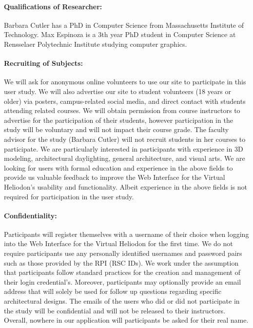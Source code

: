 \documentclass[12pt]{article}
\begin{document}
\paragraph{Qualifications of Researcher:}
Barbara Cutler has a PhD in Computer Science from Massachusetts
Institute of Technology.  Max Espinoza is a 3th year PhD student in
Computer Science at Rensselaer Polytechnic Institute studying computer
graphics.

\paragraph{Recruiting of Subjects:}
We will ask for anonymous online volunteers to use our site to participate in this user study. 
We will also advertise our site to student volunteers (18 years or older) via posters, campus-related social media, and direct contact with students attending related courses. 
We will obtain permission from course instructors to advertise for the participation of their students, however participation in the study will be voluntary and will not impact their course grade. 
The faculty advisor for the study (Barbara Cutler) will not recruit students in her courses to participate.  
We are particularly interested in participants with experience in 3D modeling, architectural daylighting, general architecture, and visual arts.
We are looking for users with formal education and experience in the above fields to provide us valuable feedback to improve the Web Interface for the Virtual Heliodon's usability and functionality. 
Albeit experience in the above fields is not required for participation in the user study.

\paragraph{Confidentiality:} 
Participants will register themselves with a username of their choice when logging into the Web Interface for the Virtual Heliodon for the first time. 
We do not require participants use any personally identified usernames and password pairs such as those provided by the RPI (RSC IDs). 
We work under the assumption that participants follow standard practices for the creation and management of their login credential's.
Moreover, participants may optionally provide an email address that will solely be used for follow up questions regarding specific architectural designs.
The emails of the users who did or did not participate in the study will be confidential and will not be released to their instructors. 
Overall, nowhere in our application will participants be asked for their real name. 
\end{document}
